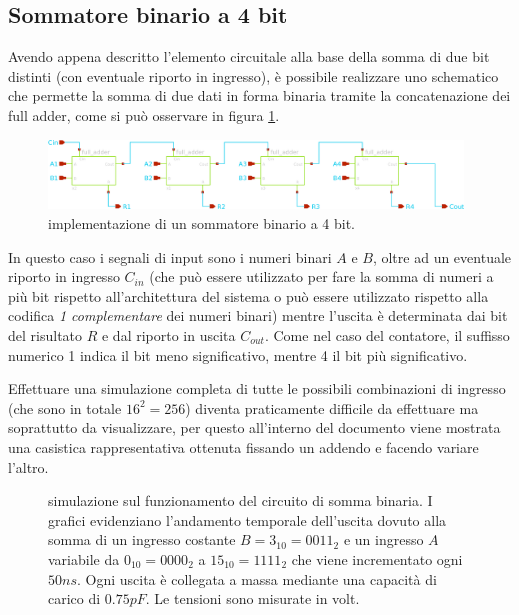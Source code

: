 	
\subsection*{Sommatore binario a 4 bit}
	Avendo appena descritto l'elemento circuitale alla base della somma di due bit distinti (con eventuale riporto in ingresso), è possibile realizzare uno schematico che permette la somma di due dati in forma binaria tramite la concatenazione dei full adder, come si può osservare in figura \ref{fig:add:sch}.
	
	\begin{figure}[bht]
		\centering
		\includegraphics[width=11cm]{Immagini/4bitadder}
		\caption{implementazione di un sommatore binario a 4 bit.}
		\label{fig:add:sch}
	\end{figure}
	
	In questo caso i segnali di input sono i numeri binari $A$ e $B$, oltre ad un eventuale riporto in ingresso $C_{in}$ (che può essere utilizzato per fare la somma di numeri a più bit rispetto all'architettura del sistema o può essere utilizzato rispetto alla codifica \textit{1 complementare} dei numeri binari) mentre l'uscita è determinata dai bit del risultato $R$ e dal riporto in uscita $C_{out}$. Come nel caso del contatore, il suffisso numerico 1 indica il bit meno significativo, mentre 4 il bit più significativo.
	
	Effettuare una simulazione completa di tutte le possibili combinazioni di ingresso (che sono in totale $16^2=256$) diventa praticamente difficile da effettuare ma soprattutto da visualizzare, per questo all'interno del documento viene mostrata una casistica rappresentativa ottenuta fissando un addendo e facendo variare l'altro.

	\begin{figure}[bht]
		\centering
		
		\caption{simulazione sul funzionamento del circuito di somma binaria. I grafici evidenziano l'andamento temporale dell'uscita dovuto alla somma di un ingresso costante $B=3_{10}=0011_{2}$ e un ingresso $A$ variabile da $0_{10}=0000_2$ a $15_{10}=1111_2$ che viene incrementato ogni $50ns$. Ogni uscita è collegata a massa mediante una capacità di carico di $0.75pF$. Le tensioni sono misurate in volt. }
		\label{fig:add:sim}
	\end{figure}
	
